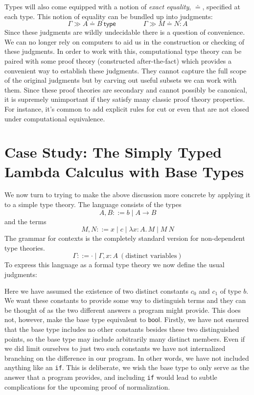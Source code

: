\documentclass{article}
\newcommand{\eeq}{\ensuremath{\doteq}}
\newcommand{\hasEF}[3]{\ensuremath{#1 \vdash #2 : #3}}
\newcommand{\hasTEC}[3]{\ensuremath{#1 \gg #2 \eeq #3\ \mathsf{type}}}
\newcommand{\hasEEC}[4]{\ensuremath{#1 \gg #2 \eeq #3 : #4}}
\newcommand{\fn}[2]{\ensuremath{#1 \to #2}}
\newcommand{\bool}{\ensuremath{\mathsf{bool}}}
\newcommand{\ap}[2]{\ensuremath{#1\ #2}}
\newcommand{\lam}[3]{\ensuremath{\lambda #1 {:} #2.\, #3}}
\begin{document}
Types will also come equipped with a notion of \emph{exact equality}, $\eeq$,
specified at each type. This notion of equality can be bundled up into
judgments:
\[
  \hasTEC{\Gamma}{A}{B} \qquad \qquad
  \hasEEC{\Gamma}{M}{N}{A}
\]
Since these judgments are wildly undecidable there is a question of
convenience. We can no longer rely on computers to aid us in the
construction or checking of these judgments. In order to work with
this, computational type theory can be paired with some proof theory
(constructed after-the-fact) which provides a convenient way to
establish these judgments. They cannot capture the full scope of the
original judgments but by carving out useful subsets we can work with
them. Since these proof theories are secondary and cannot possibly be
canonical, it is supremely unimportant if they satisfy many classic
proof theory properties. For instance, it's common to add explicit
rules for cut or even that are not closed under computational
equivalence.

\section{Case Study: The Simply Typed Lambda Calculus with Base Types}

We now turn to trying to make the above discussion more concrete by
applying it to a simple type theory. The language consists of the types
\[
  A, B ::= b \mid \fn{A}{B}
\]
and the terms
\[
  M, N ::= x \mid c \mid \lam{x}{A}{M} \mid \ap{M}{N}
\]
The grammar for contexts is the completely standard version for
non-dependent type theories.
\[
  \Gamma ::= \cdot \mid \Gamma, x : A\ (\text{distinct variables})
\]
To express this language as a formal type theory we now define the
usual judgments:
Here we have assumed the existence of two distinct constants $c_0$ and $c_1$ of type
$b$. We want these constants to provide some way to distinguish
terms and they can be thought of as the two different answers a
program might provide. This does not, however, make the base type equivalent to
$\bool$. Firstly, we have not ensured that the base type includes no
other constants besides these two distinguished points, so the base
type may include arbitrarily many distinct members. Even if we did
limit ourselves to just two such constants we have not internalized
branching on the difference in our program. In other words, we have
not included anything like an {\tt if}. This is deliberate, we wish the
base type to only serve as the answer that a program provides, and
including {\tt if} would lead to subtle complications for the upcoming
proof of normalization.
\end{document}
